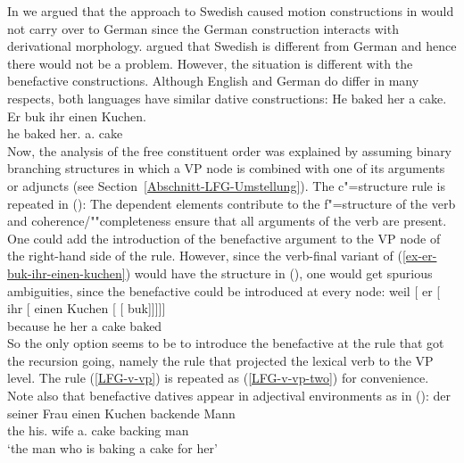 In \citet{MWArgSt} we argued that the approach to Swedish caused motion constructions in
\citet{ADT2008a,ADT2013a} would not carry over to German since the German construction interacts with derivational
morphology. \citet{AT2014a} argued that Swedish is different from German and hence there would not
be a problem. However, the situation is different with the benefactive constructions. Although
English and German do differ in many respects, both languages have similar dative constructions:
\eal
\ex He baked her a cake.
\ex
\label{ex-er-buk-ihr-einen-kuchen} 
\gll Er buk   ihr        einen Kuchen.\\
     he baked her.\dat{} a.\acc{} cake\\
\zl
Now, the analysis of the free constituent order was explained by assuming binary branching
structures in which a VP node is combined with one of its arguments or adjuncts (see
Section~\ref{Abschnitt-LFG-Umstellung}). The c"=structure rule is repeated in ():
\ea
\label{lfg-vp-regel-two}
\z
The dependent elements contribute to the f"=structure of the verb and coherence/""completeness ensure that all
arguments of the verb are present. One could add the introduction of the benefactive argument to
the VP node of the right-hand side of the rule. However, since the verb-final variant of
(\ref{ex-er-buk-ihr-einen-kuchen}) would have the structure in (), one would get spurious
ambiguities, since the benefactive could be introduced at every node:
\ea
\gll weil    [ er [ ihr [ einen Kuchen [ [ buk]]]]]\\
     because {}        he {}        her {}        a cake       {}        {}       baked\\
\z
So the only option seems to be to introduce the benefactive at the rule that got the recursion
going, namely the rule that projected the lexical verb to the VP level. The rule (\ref{LFG-v-vp}) is
repeated as (\ref{LFG-v-vp-two}) for convenience.
\ea
\label{LFG-v-vp-two}
\z
Note also that benefactive datives appear in adjectival environments as in ():
\eal
\ex
\gll der seiner Frau einen Kuchen backende Mann\\
     the his.\dat{} wife a.\acc{} cake backing man\\
\glt `the man who is baking a cake for her'
